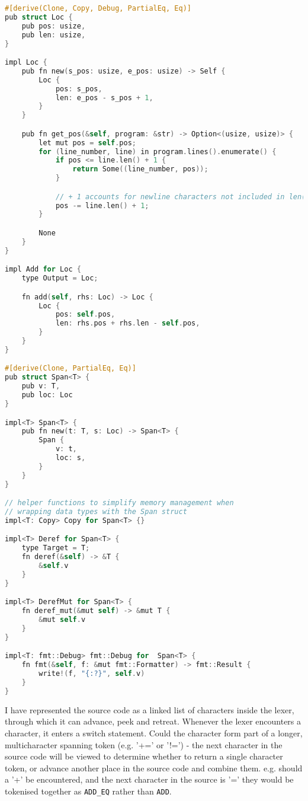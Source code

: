 \begin{lstlisting}[language=C]
#[derive(Clone, Copy, Debug, PartialEq, Eq)]
pub struct Loc {
    pub pos: usize,
    pub len: usize,
}

impl Loc {
    pub fn new(s_pos: usize, e_pos: usize) -> Self {
        Loc {
            pos: s_pos,
            len: e_pos - s_pos + 1,
        }
    }

    pub fn get_pos(&self, program: &str) -> Option<(usize, usize)> {
        let mut pos = self.pos;
        for (line_number, line) in program.lines().enumerate() {
            if pos <= line.len() + 1 {
                return Some((line_number, pos));
            }

            // + 1 accounts for newline characters not included in len()
            pos -= line.len() + 1;
        }

        None
    }
}

impl Add for Loc {
    type Output = Loc;

    fn add(self, rhs: Loc) -> Loc {
        Loc {
            pos: self.pos,
            len: rhs.pos + rhs.len - self.pos,
        }
    }
}

#[derive(Clone, PartialEq, Eq)]
pub struct Span<T> {
    pub v: T,
    pub loc: Loc
}

impl<T> Span<T> {
    pub fn new(t: T, s: Loc) -> Span<T> {
        Span {
            v: t,
            loc: s,
        }
    }
}

// helper functions to simplify memory management when 
// wrapping data types with the Span struct
impl<T: Copy> Copy for Span<T> {}

impl<T> Deref for Span<T> {
    type Target = T;
    fn deref(&self) -> &T {
        &self.v
    }
}

impl<T> DerefMut for Span<T> {
    fn deref_mut(&mut self) -> &mut T {
        &mut self.v
    }
}

impl<T: fmt::Debug> fmt::Debug for  Span<T> {
    fn fmt(&self, f: &mut fmt::Formatter) -> fmt::Result {
        write!(f, "{:?}", self.v)
    }
}
\end{lstlisting}

I have represented the source code as a linked list of characters inside the lexer, through which it can advance, peek and retreat. Whenever the lexer encounters a character, it enters a switch statement. Could the character form part of a longer, multicharacter spanning token (e.g. '+=' or '!=') - the next character in the source code will be viewed to determine whether to return a single character token, or advance another place in the source code and combine them. e.g. should a '+' be encountered, and the next character in the source is '=' they would be tokenised together as \texttt{ADD\_EQ} rather than \texttt{ADD}.

